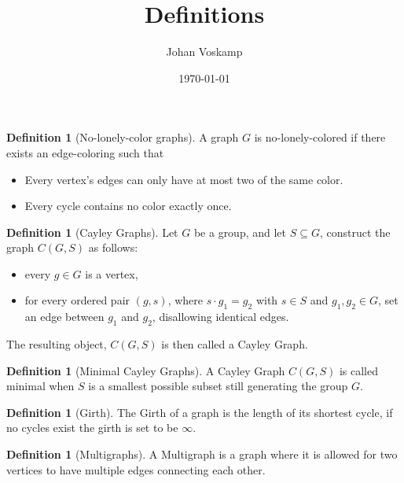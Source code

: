 \documentclass[a4paper,10pt]{article}
\title{Definitions}
\author{Johan Voskamp}
\date{\today}
\theoremstyle{plain}
\theoremstyle{definition}
\newtheorem{definition}[theorem]{Definition}
\theoremstyle{remark}
\begin{document}
    \maketitle
    
    \section{}
    
   
    
    \begin{definition}[No-lonely-color graphs]\label{def:lonely}
    	A graph \(G\) is no-lonely-colored if there exists an edge-coloring such that 
        \begin{itemize}
            \item Every vertex's edges can only have at most two of the same color.
            \item Every cycle contains no color exactly once.
        \end{itemize}
    \end{definition}

    \begin{definition}[Cayley Graphs]\label{cayley}
        Let \(G\) be a group, and let \(S
        \subseteq G\), construct the graph \(C(G,S)\) as follows:
        \begin{itemize}
            \item every \(g\in G\) is a vertex,
            \item for every ordered pair \((g, s)\), where \(s\cdot g_1 = g_2\) with \(s\in S\) and \(g_1, g_2\in G\), set an edge between \(g_1\) and \(g_2\), disallowing identical edges.
        \end{itemize}
        The resulting object, \(C(G,S)\) is then called a Cayley Graph.
    \end{definition}

    \begin{definition}[Minimal Cayley Graphs]\label{min-cayley}
        A Cayley Graph \(C(G,S)\) is called minimal when \(S\) is a smallest possible subset still generating the group \(G\).
    \end{definition}
    
    \begin{definition}[Girth]\label{girth}
        The Girth of a graph is the length of its shortest cycle, if no cycles exist the girth is set to be \(\infty\).
    \end{definition}
    
    \begin{definition}[Multigraphs]\label{multigraph}
        A Multigraph is a graph where it is allowed for two vertices to have multiple edges connecting each other.
    \end{definition}
\end{document}
